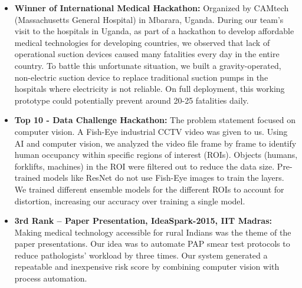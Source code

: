 \documentclass{ExpressiveResume}
\begin{document}
\begin{itemize}

\item {\textbf{Winner of International Medical Hackathon:} Organized by CAMtech (Massachusetts General Hospital) in Mbarara, Uganda. During our team’s visit to the hospitals in Uganda, as part of a hackathon to develop affordable medical technologies for developing countries, we observed that lack of operational suction devices caused many fatalities every day in the entire country. To battle this unfortunate situation, we built a gravity-operated, non-electric suction device to replace traditional suction pumps in the hospitals where electricity is not reliable. On full deployment, this working prototype could potentially prevent around 20-25 fatalities daily.}
\item {\textbf{Top 10 - Data Challenge Hackathon:} The problem statement focused on computer vision. A Fish-Eye industrial CCTV video was given to us. Using AI and computer vision, we analyzed the video file frame by frame to identify human occupancy within specific regions of interest (ROIs). Objects (humans, forklifts, machines) in the ROI were filtered out to reduce the data size. Pre-trained models like ResNet do not use Fish-Eye images to train the layers. We trained different ensemble models for the different ROIs to account for distortion, increasing our accuracy over training a single model.}

\item {\textbf{3rd Rank – Paper Presentation, IdeaSpark-2015, IIT Madras:} Making medical technology accessible for rural Indians was the theme of the paper presentations. Our idea was to automate PAP smear test protocols to reduce pathologists' workload by three times. Our system generated a repeatable and inexpensive risk score by combining computer vision with process automation.}


\end{itemize}
\end{document}
